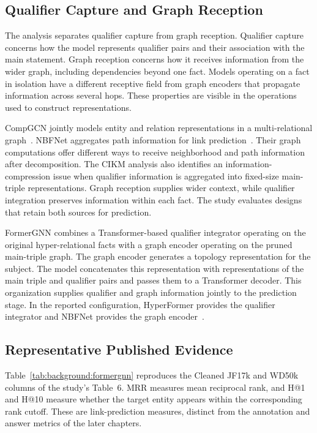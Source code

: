 \subsection{Qualifier Capture and Graph Reception}

The analysis separates qualifier capture from graph reception. Qualifier capture concerns how the model represents qualifier pairs and their association with the main statement. Graph reception concerns how it receives information from the wider graph, including dependencies beyond one fact. Models operating on a fact in isolation have a different receptive field from graph encoders that propagate information across several hops. These properties are visible in the operations used to construct representations.

CompGCN jointly models entity and relation representations in a multi-relational graph~\cite{bg-compgcn}. NBFNet aggregates path information for link prediction~\cite{bg-nbfnet}. Their graph computations offer different ways to receive neighborhood and path information after decomposition. The CIKM analysis also identifies an information-compression issue when qualifier information is aggregated into fixed-size main-triple representations. Graph reception supplies wider context, while qualifier integration preserves information within each fact. The study evaluates designs that retain both sources for prediction.

FormerGNN combines a Transformer-based qualifier integrator operating on the original hyper-relational facts with a graph encoder operating on the pruned main-triple graph. The graph encoder generates a topology representation for the subject. The model concatenates this representation with representations of the main triple and qualifier pairs and passes them to a Transformer decoder. This organization supplies qualifier and graph information jointly to the prediction stage. In the reported configuration, HyperFormer provides the qualifier integrator and NBFNet provides the graph encoder~\cite{bg-hyperformer,bg-nbfnet}.

\subsection{Representative Published Evidence}

Table~\ref{tab:background:formergnn} reproduces the Cleaned JF17k and WD50k columns of the study's Table~6. MRR measures mean reciprocal rank, and H@1 and H@10 measure whether the target entity appears within the corresponding rank cutoff. These are link-prediction measures, distinct from the annotation and answer metrics of the later chapters.

